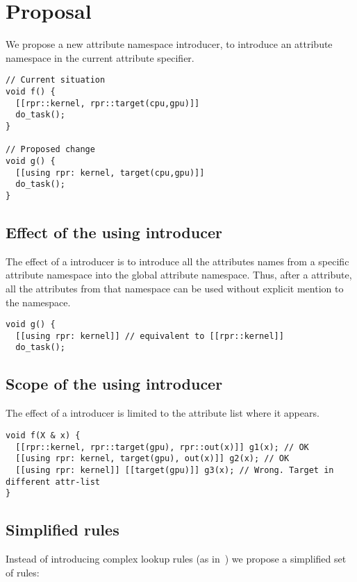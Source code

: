 \section{Proposal}

We propose a new attribute namespace introducer, to introduce an attribute
namespace in the current attribute specifier.

\begin{lstlisting}
// Current situation
void f() {
  [[rpr::kernel, rpr::target(cpu,gpu)]]
  do_task();
}

// Proposed change
void g() {
  [[using rpr: kernel, target(cpu,gpu)]]
  do_task();
}
\end{lstlisting}

\subsection{Effect of the using introducer}

The effect of a  introducer is to introduce all the attributes
names from a specific attribute namespace into the global attribute namespace.
Thus, after a  attribute, all the attributes from that namespace
can be used without explicit mention to the namespace.

\begin{lstlisting}
void g() {
  [[using rpr: kernel]] // equivalent to [[rpr::kernel]]
  do_task();
\end{lstlisting}

\subsection{Scope of the using introducer}
\label{scoping}

The effect of a  introducer is limited to the attribute list
where it appears.

\begin{lstlisting}
void f(X & x) {
  [[rpr::kernel, rpr::target(gpu), rpr::out(x)]] g1(x); // OK
  [[using rpr: kernel, target(gpu), out(x)]] g2(x); // OK
  [[using rpr: kernel]] [[target(gpu)]] g3(x); // Wrong. Target in different attr-list
}
\end{lstlisting}

\subsection{Simplified rules}

Instead of introducing complex lookup rules (as in~\cite{p0082r1}) we propose
a simplified set of rules:


